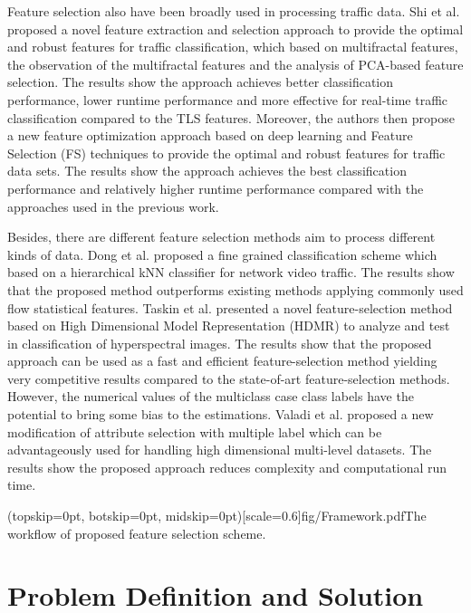 \documentclass{ieeeaccess}
\theoremstyle{definition}
\begin{document}
Feature selection also have been broadly used in processing traffic data. Shi et al.\cite{Shi2017} proposed a novel feature extraction and selection approach to provide the optimal and robust features for traffic classification, which based on multifractal features, the observation of the multifractal features and the analysis of PCA-based feature selection. The results show the approach achieves better classification performance, lower runtime performance and more effective for real-time traffic classification compared to the TLS features. Moreover, the authors then propose a new feature optimization approach based on deep learning and Feature Selection (FS) techniques\cite{Shi2018} to provide the optimal and robust features for traffic data sets. The results show the approach achieves the best classification performance and relatively higher runtime performance compared with the approaches used in the previous work.

Besides, there are different feature selection methods aim to process different kinds of data. Dong et al.\cite{Dong2017} proposed a fine grained classification scheme which based on a hierarchical kNN classifier for network video traffic. The results show that the proposed method outperforms existing methods applying commonly used flow statistical features. Taskin et al.\cite{Taskin2017} presented a novel feature-selection method based on High Dimensional Model Representation (HDMR) to analyze and test in classification of hyperspectral images. The results show that the proposed approach can be used as a fast and efficient feature-selection method yielding very competitive results compared to the state-of-art feature-selection methods. However, the numerical values of the multiclass case class labels have the potential to bring some bias to the estimations. Valadi et al.\cite{Valadi2019} proposed a new modification of attribute selection with multiple label which can be advantageously used for handling high dimensional multi-level datasets. The results show the proposed approach reduces complexity and computational run time.

\Figure[t](topskip=0pt, botskip=0pt, midskip=0pt)[scale=0.6]{fig/Framework.pdf}{The workflow of proposed feature selection scheme.\label{fig:framework}}

\section{Problem Definition and Solution}
\label{sec:problem}
\end{document}
